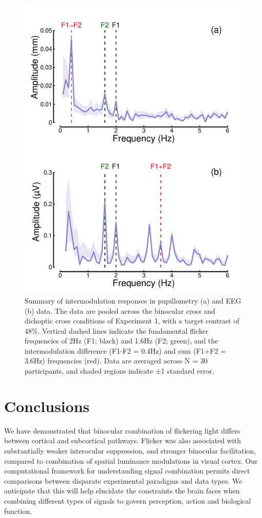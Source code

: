 \documentclass[
]{article}
\begin{document}
\begin{figure}

{\centering \includegraphics[width=0.5\linewidth]{Figures/IMresponse} 

}

\caption{Summary of intermodulation responses in pupillometry (a) and EEG (b) data. The data are pooled across the binocular cross and dichoptic cross conditions of Experiment 1, with a target contrast of 48\%. Vertical dashed lines indicate the fundamental flicker frequencies of 2Hz (F1; black) and 1.6Hz (F2; green), and the intermodulation difference (F1-F2 = 0.4Hz) and sum (F1+F2 = 3.6Hz) frequencies (red). Data are averaged across N = 30 participants, and shaded regions indicate ±1 standard error.}\label{fig:IMfig}
\end{figure}

\hypertarget{conclusions}{%
\section{Conclusions}\label{conclusions}}

We have demonstrated that binocular combination of flickering light differs between cortical and subcortical pathways. Flicker was also associated with substantially weaker interocular suppression, and stronger binocular facilitation, compared to combination of spatial luminance modulations in visual cortex. Our computational framework for understanding signal combination permits direct comparisons between disparate experimental paradigms and data types. We anticipate that this will help elucidate the constraints the brain faces when combining different types of signals to govern perception, action and biological function.
\end{document}
